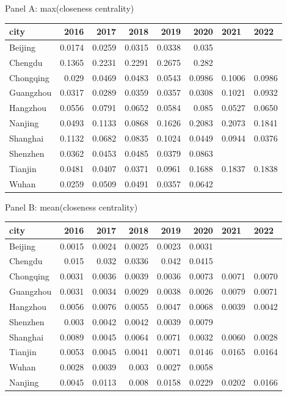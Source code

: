 \caption{Panel A: max(closeness centrality)}
\begin{tabular}{lrrrrrll}
\hline
 city      &   2016 &   2017 &   2018 &   2019 &   2020 & 2021   & 2022   \\
\hline
 Beijing   & 0.0174 & 0.0259 & 0.0315 & 0.0338 & 0.035  &        &        \\
 Chengdu   & 0.1365 & 0.2231 & 0.2291 & 0.2675 & 0.282  &        &        \\
 Chongqing & 0.029  & 0.0469 & 0.0483 & 0.0543 & 0.0986 & 0.1006 & 0.0986 \\
 Guangzhou & 0.0317 & 0.0289 & 0.0359 & 0.0357 & 0.0308 & 0.1021 & 0.0932 \\
 Hangzhou  & 0.0556 & 0.0791 & 0.0652 & 0.0584 & 0.085  & 0.0527 & 0.0650 \\
 Nanjing   & 0.0493 & 0.1133 & 0.0868 & 0.1626 & 0.2083 & 0.2073 & 0.1841 \\
 Shanghai  & 0.1132 & 0.0682 & 0.0835 & 0.1024 & 0.0449 & 0.0944 & 0.0376 \\
 Shenzhen  & 0.0362 & 0.0453 & 0.0485 & 0.0379 & 0.0863 &        &        \\
 Tianjin   & 0.0481 & 0.0407 & 0.0371 & 0.0961 & 0.1688 & 0.1837 & 0.1838 \\
 Wuhan     & 0.0259 & 0.0509 & 0.0491 & 0.0357 & 0.0642 &        &        \\
\hline
\end{tabular}

\caption{Panel B: mean(closeness centrality)}
\begin{tabular}{lrrrrrll}
\hline
 city      &   2016 &   2017 &   2018 &   2019 &   2020 & 2021   & 2022   \\
\hline
 Beijing   & 0.0015 & 0.0024 & 0.0025 & 0.0023 & 0.0031 &        &        \\
 Chengdu   & 0.015  & 0.032  & 0.0336 & 0.042  & 0.0415 &        &        \\
 Chongqing & 0.0031 & 0.0036 & 0.0039 & 0.0036 & 0.0073 & 0.0071 & 0.0070 \\
 Guangzhou & 0.0031 & 0.0034 & 0.0029 & 0.0038 & 0.0026 & 0.0079 & 0.0071 \\
 Hangzhou  & 0.0056 & 0.0076 & 0.0055 & 0.0047 & 0.0068 & 0.0039 & 0.0042 \\
 Shenzhen  & 0.003  & 0.0042 & 0.0042 & 0.0039 & 0.0079 &        &        \\
 Shanghai  & 0.0089 & 0.0045 & 0.0064 & 0.0071 & 0.0032 & 0.0060 & 0.0028 \\
 Tianjin   & 0.0053 & 0.0045 & 0.0041 & 0.0071 & 0.0146 & 0.0165 & 0.0164 \\
 Wuhan     & 0.0028 & 0.0039 & 0.003  & 0.0027 & 0.0058 &        &        \\
 Nanjing   & 0.0045 & 0.0113 & 0.008  & 0.0158 & 0.0229 & 0.0202 & 0.0166 \\
\hline
\end{tabular}

